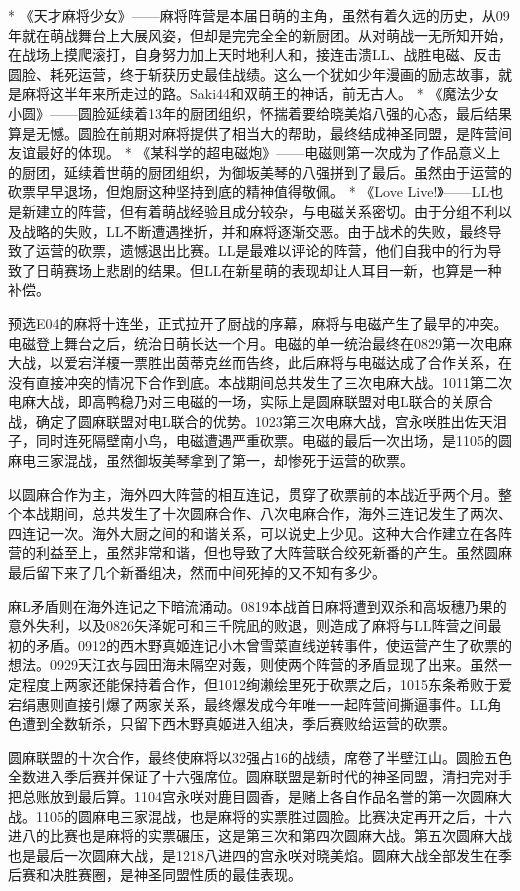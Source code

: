 * 《天才麻将少女》——麻将阵营是本届日萌的主角，虽然有着久远的历史，从09年就在萌战舞台上大展风姿，但却是完完全全的新厨团。从对萌战一无所知开始，在战场上摸爬滚打，自身努力加上天时地利人和，接连击溃LL、战胜电磁、反击圆脸、耗死运营，终于斩获历史最佳战绩。这么一个犹如少年漫画的励志故事，就是麻将这半年来所走过的路。Saki44和双萌王的神话，前无古人。
* 《魔法少女小圆》——圆脸延续着13年的厨团组织，怀揣着要给晓美焰八强的心态，最后结果算是无憾。圆脸在前期对麻将提供了相当大的帮助，最终结成神圣同盟，是阵营间友谊最好的体现。
* 《某科学的超电磁炮》——电磁则第一次成为了作品意义上的厨团，延续着世萌的厨团组织，为御坂美琴的八强拼到了最后。虽然由于运营的砍票早早退场，但炮厨这种坚持到底的精神值得敬佩。
* 《Love Live!》——LL也是新建立的阵营，但有着萌战经验且成分较杂，与电磁关系密切。由于分组不利以及战略的失败，LL不断遭遇挫折，并和麻将逐渐交恶。由于战术的失败，最终导致了运营的砍票，遗憾退出比赛。LL是最难以评论的阵营，他们自我中的行为导致了日萌赛场上悲剧的结果。但LL在新星萌的表现却让人耳目一新，也算是一种补偿。

预选E04的麻将十连坐，正式拉开了厨战的序幕，麻将与电磁产生了最早的冲突。电磁登上舞台之后，统治日萌长达一个月。电磁的单一统治最终在0829第一次电麻大战，以爱宕洋榎一票胜出茵蒂克丝而告终，此后麻将与电磁达成了合作关系，在没有直接冲突的情况下合作到底。本战期间总共发生了三次电麻大战。1011第二次电麻大战，即高鸭稳乃对三电磁的一场，实际上是圆麻联盟对电L联合的关原合战，确定了圆麻联盟对电L联合的优势。1023第三次电麻大战，宫永咲胜出佐天泪子，同时连死隔壁南小鸟，电磁遭遇严重砍票。电磁的最后一次出场，是1105的圆麻电三家混战，虽然御坂美琴拿到了第一，却惨死于运营的砍票。

以圆麻合作为主，海外四大阵营的相互连记，贯穿了砍票前的本战近乎两个月。整个本战期间，总共发生了十次圆麻合作、八次电麻合作，海外三连记发生了两次、四连记一次。海外大厨之间的和谐关系，可以说史上少见。这种大合作建立在各阵营的利益至上，虽然非常和谐，但也导致了大阵营联合绞死新番的产生。虽然圆麻最后留下来了几个新番组决，然而中间死掉的又不知有多少。

麻L矛盾则在海外连记之下暗流涌动。0819本战首日麻将遭到双杀和高坂穗乃果的意外失利，以及0826矢泽妮可和三千院凪的败退，则造成了麻将与LL阵营之间最初的矛盾。0912的西木野真姬连记小木曾雪菜直线逆转事件，使运营产生了砍票的想法。0929天江衣与园田海未隔空对轰，则使两个阵营的矛盾显现了出来。虽然一定程度上两家还能保持着合作，但1012绚濑绘里死于砍票之后，1015东条希败于爱宕绢惠则直接引爆了两家关系，最终爆发成今年唯一一起阵营间撕逼事件。LL角色遭到全数斩杀，只留下西木野真姬进入组决，季后赛败给运营的砍票。

圆麻联盟的十次合作，最终使麻将以32强占16的战绩，席卷了半壁江山。圆脸五色全数进入季后赛并保证了十六强席位。圆麻联盟是新时代的神圣同盟，清扫完对手把总账放到最后算。1104宫永咲对鹿目圆香，是赌上各自作品名誉的第一次圆麻大战。1105的圆麻电三家混战，也是麻将的实票胜过圆脸。比赛决定再开之后，十六进八的比赛也是麻将的实票碾压，这是第三次和第四次圆麻大战。第五次圆麻大战也是最后一次圆麻大战，是1218八进四的宫永咲对晓美焰。圆麻大战全部发生在季后赛和决胜赛圈，是神圣同盟性质的最佳表现。


